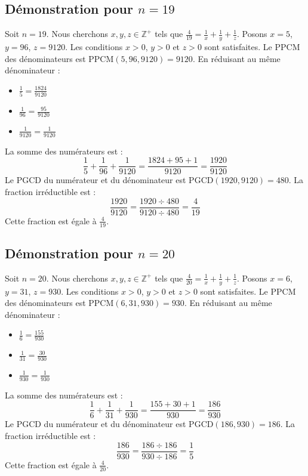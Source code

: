 \documentclass[11pt,a4paper]{article}
\begin{document}
\subsection{Démonstration pour $n = 19$}
Soit $n = 19$. Nous cherchons $x, y, z \in \mathbb{Z}^{+}$ tels que $\frac{4}{19} = \frac{1}{x} + \frac{1}{y} + \frac{1}{z}$.
Posons $x = 5$, $y = 96$, $z = 9120$.
Les conditions $x > 0$, $y > 0$ et $z > 0$ sont satisfaites.
Le PPCM des dénominateurs est $\text{PPCM}(5, 96, 9120) = 9120$.
En réduisant au même dénominateur :
\begin{itemize}
    \item $\frac{1}{5} = \frac{1824}{9120}$
    \item $\frac{1}{96} = \frac{95}{9120}$
    \item $\frac{1}{9120} = \frac{1}{9120}$
\end{itemize}
La somme des numérateurs est :
$$ \frac{1}{5} + \frac{1}{96} + \frac{1}{9120} = \frac{1824 + 95 + 1}{9120} = \frac{1920}{9120} $$
Le PGCD du numérateur et du dénominateur est $\text{PGCD}(1920, 9120) = 480$.
La fraction irréductible est :
$$ \frac{1920}{9120} = \frac{1920 \div 480}{9120 \div 480} = \frac{4}{19} $$
Cette fraction est égale à $\frac{4}{19}$.

\subsection{Démonstration pour $n = 20$}
Soit $n = 20$. Nous cherchons $x, y, z \in \mathbb{Z}^{+}$ tels que $\frac{4}{20} = \frac{1}{x} + \frac{1}{y} + \frac{1}{z}$.
Posons $x = 6$, $y = 31$, $z = 930$.
Les conditions $x > 0$, $y > 0$ et $z > 0$ sont satisfaites.
Le PPCM des dénominateurs est $\text{PPCM}(6, 31, 930) = 930$.
En réduisant au même dénominateur :
\begin{itemize}
    \item $\frac{1}{6} = \frac{155}{930}$
    \item $\frac{1}{31} = \frac{30}{930}$
    \item $\frac{1}{930} = \frac{1}{930}$
\end{itemize}
La somme des numérateurs est :
$$ \frac{1}{6} + \frac{1}{31} + \frac{1}{930} = \frac{155 + 30 + 1}{930} = \frac{186}{930} $$
Le PGCD du numérateur et du dénominateur est $\text{PGCD}(186, 930) = 186$.
La fraction irréductible est :
$$ \frac{186}{930} = \frac{186 \div 186}{930 \div 186} = \frac{1}{5} $$
Cette fraction est égale à $\frac{4}{20}$.
\end{document}
